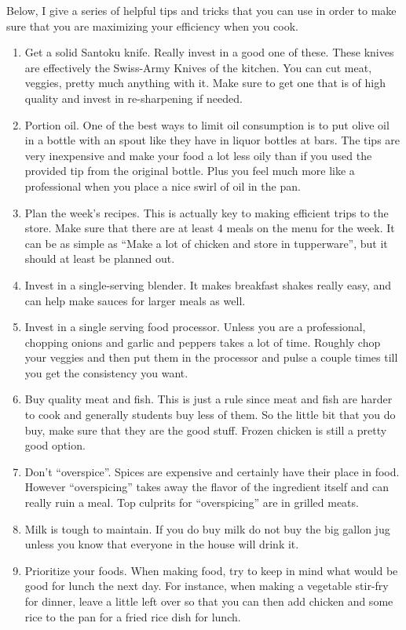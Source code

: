 

Below, I give a series of helpful tips and tricks that you can use in order to make sure that you are maximizing your efficiency when you cook. 

\begin{enumerate}
\item Get a solid Santoku knife. Really invest in a good one of these. These knives are effectively the Swiss-Army Knives of the kitchen. You can cut meat, veggies, pretty much anything with it. Make sure to get one that is of high quality and invest in re-sharpening if needed.
\item Portion oil. One of the best ways to limit oil consumption is to put olive oil in a bottle with an spout like they have in liquor bottles at bars. The tips are very inexpensive and make your food a lot less oily than if you used the provided tip from the original bottle. Plus you feel much more like a professional when you place a nice swirl of oil in the pan. 
\item Plan the week's recipes. This is actually key to making efficient trips to the store. Make sure that there are at least 4 meals on the menu for the week. It can be as simple as ``Make a lot of chicken and store in tupperware'', but it should at least be planned out. 
\item Invest in a single-serving blender. It makes breakfast shakes really easy, and can help make sauces for larger meals as well.
\item Invest in a single serving food processor. Unless you are a professional, chopping onions and garlic and peppers takes a lot of time. Roughly chop your veggies and then put them in the processor and pulse a couple times till you get the consistency you want. 
\item Buy quality meat and fish. This is just a rule since meat and fish are harder to cook and generally students buy less of them. So the little bit that you do buy, make sure that they are the good stuff. Frozen chicken is still a pretty good option. 
\item Don't ``overspice''. Spices are expensive and certainly have their place in food. However ``overspicing'' takes away the flavor of the ingredient itself and can really ruin a meal. Top culprits for ``overspicing'' are in grilled meats. 
\item Milk is tough to maintain. If you do buy milk do not buy the big gallon jug unless you know that everyone in the house will drink it. 
\item Prioritize your foods. When making food, try to keep in mind what would be good for lunch the next day. For instance, when making a vegetable stir-fry for dinner, leave a little left over so that you can then add chicken and some rice to the pan for a fried rice dish for lunch. 
\end{enumerate}

